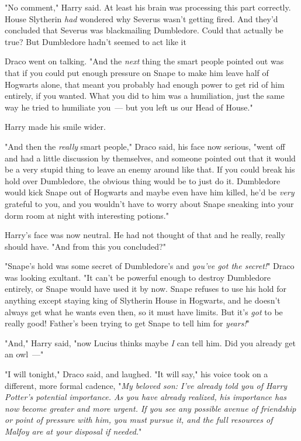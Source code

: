 "No comment," Harry said. At least his brain was processing this part
correctly. House Slytherin \emph{had} wondered why Severus wasn't getting
fired. And they'd concluded that Severus was blackmailing Dumbledore. Could
that actually be true\el? But Dumbledore hadn't seemed to act like
it{\el}

Draco went on talking. "And the \emph{next} thing the smart people pointed out
was that if you could put enough pressure on Snape to make him leave half of
Hogwarts alone, that meant you probably had enough power to get rid of him
entirely, if you wanted. What you did to him was a humiliation, just the same
way he tried to humiliate you~--- but you left us our Head of House."

Harry made his smile wider.

"And then the \emph{really} smart people," Draco said, his face now serious,
"went off and had a little discussion by themselves, and someone pointed out
that it would be a very stupid thing to leave an enemy around like that. If you
could break his hold over Dumbledore, the obvious thing would be to just do it.
Dumbledore would kick Snape out of Hogwarts and maybe even have him killed,
he'd be \emph{very} grateful to you, and you wouldn't have to worry about Snape
sneaking into your dorm room at night with interesting potions."

Harry's face was now neutral. He had not thought of that and he really, really
should have. "And from this you concluded\el?"

"Snape's hold was some secret of Dumbledore's and \emph{you've got the
secret!}" Draco was looking exultant. "It can't be powerful enough to destroy
Dumbledore entirely, or Snape would have used it by now. Snape refuses to use
his hold for anything except staying king of Slytherin House in Hogwarts, and
he doesn't always get what he wants even then, so it must have limits. But it's
\emph{got} to be really good! Father's been trying to get Snape to tell him for
\emph{years!}"

"And," Harry said, "now Lucius thinks maybe \emph{I} can tell him. Did you
already get an owl~---"

"I will tonight," Draco said, and laughed. "It will say," his voice took on a
different, more formal cadence, "\emph{My beloved son: I've already told you of
Harry Potter's potential importance. As you have already realized, his
importance has now become greater and more urgent. If you see any possible
avenue of friendship or point of pressure with him, you must pursue it, and the
full resources of Malfoy are at your disposal if needed.}"

